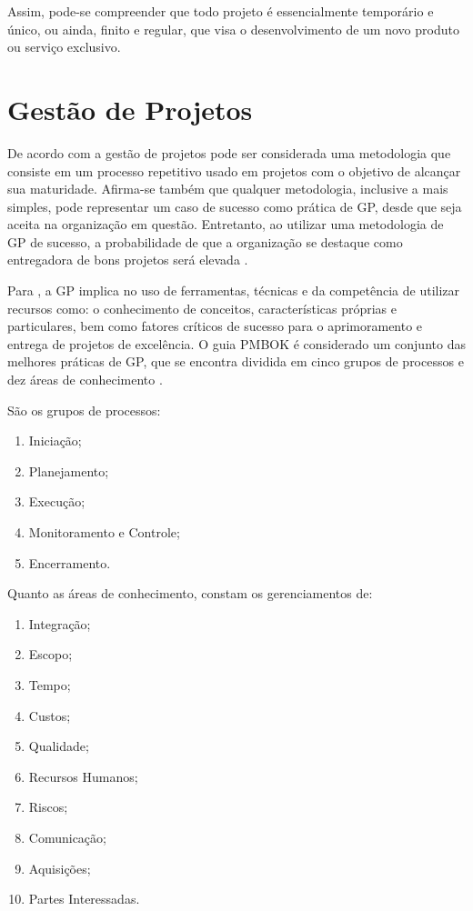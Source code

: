 Assim, pode-se compreender que todo projeto é essencialmente temporário e único, ou ainda, finito e regular, que visa o desenvolvimento de um novo produto ou serviço exclusivo.


\section{Gestão de Projetos}

De acordo com  a gestão de projetos pode ser considerada uma metodologia que consiste em um processo repetitivo usado em projetos com o objetivo de alcançar sua maturidade. Afirma-se também que qualquer metodologia, inclusive a mais simples, pode representar um caso de sucesso como prática de GP, desde que seja aceita na organização em questão. Entretanto, ao utilizar uma metodologia de GP de sucesso, a probabilidade de que a organização se destaque como entregadora de bons projetos será elevada \cite{kerzner2013project}.

Para , a GP implica no uso de ferramentas, técnicas e da competência de utilizar recursos como: o conhecimento de conceitos, características próprias e particulares, bem como fatores críticos de sucesso para o aprimoramento e entrega de projetos de excelência. O guia PMBOK é considerado um conjunto das melhores práticas de GP, que se encontra dividida em cinco grupos de processos e dez áreas de conhecimento \cite{pmiguide2014}.

São os grupos de processos:
\singlespacing
\begin{enumerate}
  \item Iniciação;
  \item Planejamento;
  \item Execução;
  \item Monitoramento e Controle;
  \item Encerramento.
\end{enumerate}
\onehalfspacing

Quanto as áreas de conhecimento, constam os gerenciamentos de:

\singlespacing
\begin{enumerate}
  \item Integração;
  \item Escopo;
  \item Tempo;
  \item Custos;
  \item Qualidade;
  \item Recursos Humanos;
  \item Riscos;
  \item Comunicação;
  \item Aquisições;
  \item Partes Interessadas.
\end{enumerate}
\onehalfspacing


